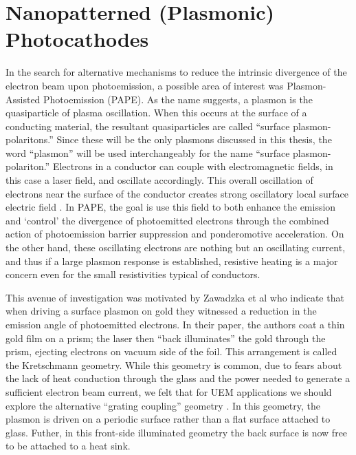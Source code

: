 
\section{Nanopatterned (Plasmonic) Photocathodes}

In the search for alternative mechanisms to reduce the intrinsic divergence of the electron beam upon photoemission, a possible area of interest was Plasmon-Assisted Photoemission (PAPE). 
As the name suggests, a plasmon is the quasiparticle of plasma oscillation.
When this occurs at the surface of a conducting material, the resultant quasiparticles are called ``surface plasmon-polaritons.''
Since these will be the only plasmons discussed in this thesis, the word ``plasmon'' will be used interchangeably for the name ``surface plasmon-polariton.''
Electrons in a conductor can couple with electromagnetic fields, in this case a laser field, and oscillate accordingly.
This overall oscillation of electrons near the surface of the conductor creates strong oscillatory local surface electric field \cite{cottam_introduction_2004,concepts_2002}.
In PAPE, the goal is use this field to both enhance the emission and `control' the divergence of photoemitted electrons through the combined action of photoemission barrier suppression and ponderomotive acceleration.
On the other hand, these oscillating electrons are nothing but an oscillating current, and thus if a large plasmon response is established, resistive heating is a major concern even for the small resistivities typical of conductors.

This avenue of investigation was motivated by Zawadzka et al \cite{zawadzka_evanescent_2001} who indicate that when driving a surface plasmon on gold they witnessed a reduction in the emission angle of photoemitted electrons.
In their paper, the authors coat a thin gold film on a prism; the laser then ``back illuminates'' the gold through the prism, ejecting electrons on vacuum side of the foil.
This arrangement is called the Kretschmann geometry.
While this geometry is common, due to fears about the lack of heat conduction through the glass and the power needed to generate a sufficient electron beam current, we felt that for UEM applications we should explore the alternative ``grating coupling'' geometry \cite{kupersztych_ponderomotive_2001,kupersztych_anomalous_2005,li_surface_2013}.
In this geometry, the plasmon is driven on a periodic surface rather than a flat surface attached to glass.
Futher, in this front-side illuminated geometry the back surface is now free to be attached to a heat sink.

